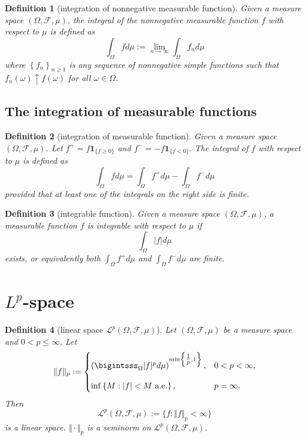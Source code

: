 \documentclass{report}
\newtheorem{definition}{Definition}[section]
\theoremstyle{nonumberplain}
\begin{document}
\begin{definition}[integration of nonnegative measurable function]
	Given a measure space $(\Omega, \mathcal{F},\mu)$, the integral of the nonnegative measurable function $f$ with respect to $\mu$
	is defined as
	\[
	\int_\Omega fd\mu:=\lim _{n \rightarrow \infty} \int_\Omega f_{n} d \mu
	\]
	where $\left\{f_{n}\right\}_{n \geq 1}$ is any sequence of nonnegative simple functions such that $f_{n}(\omega) \uparrow f(\omega)$ for all $\omega\in\Omega$.
\end{definition}

\subsection{The integration of measurable functions}
\begin{definition}[integration of measurable function]
	Given a measure space $(\Omega, \mathcal{F},\mu)$. Let $f^{+}=f \mathbf{1}_{\{f \geq 0\}}$ and $f^{-}=-f \mathbf{1}_{\{f<0\}} .$ The integral of $f$ with respect to $\mu$ is defined as
	\[
	\int_\Omega f d \mu=\int_\Omega f^{+} d \mu-\int_\Omega f^{-} d \mu
	\]
	provided that at least one of the integrals on the right side is finite.
\end{definition}

\begin{definition}[integrable function]
	Given a measure space $(\Omega, \mathcal{F},\mu)$, a measurable function $f$ is integrable with respect to $\mu$ if
	\[
	\int_\Omega |f| d \mu
	\]
	exists, or equivalently both $\int_\Omega f^+ d \mu$ and $\int_\Omega f^- d \mu$ are finite.
\end{definition}

\section{$L^p$-space}

\begin{definition}[linear space $\mathcal{L}^p(\Omega, \mathcal{F}, \mu)$] Let $(\Omega, \mathcal{F}, \mu)$ be a measure space and $0< p \leq\infty$. Let
\[
	\Vert f\Vert_p:=
	\begin{cases}
		\left(\bigintsss_\Omega |f|^pd\mu\right)^{\min\left\{\tfrac{1}{p},1\right\}},&0< p< \infty,\\[10pt]
		\inf \left\{M: |f|<M\text{ a.e.}\right\},&p=\infty.
	\end{cases}
\]
Then 
\[
\mathcal{L}^{p}(\Omega, \mathcal{F}, \mu):=\{f:\Vert f\Vert_p<\infty\}
\]
is a linear space. $\Vert \cdot\Vert_p$ is a seminorm on $\mathcal{L}^{p}(\Omega, \mathcal{F}, \mu)$.

\end{definition}
\end{document}
